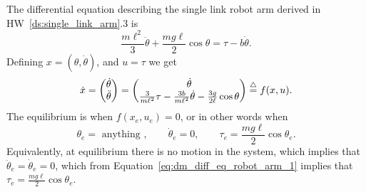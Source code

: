 
The differential equation describing the single link robot arm derived in HW~\ref{ds:single_link_arm}.3 is
\begin{equation}\label{eq:dm_diff_eq_robot_arm_1}
\frac{m\ell^2}{3}\ddot{\theta} + \frac{mg\ell}{2}\cos\theta = \tau - b\dot{\theta}.
\end{equation}
Defining $x=(\theta, \dot{\theta})$, and $u=\tau$ we get
\begin{align*}
\dot{x} = \begin{pmatrix} \dot{\theta} \\ \ddot{\theta}\end{pmatrix} 
= \begin{pmatrix} \dot{\theta} \\ \frac{3}{m\ell^2}\tau - \frac{3b}{m\ell^2}\dot{\theta} - \frac{3g}{2\ell}\cos\theta \end{pmatrix} \stackrel{\triangle}{=} f(x,u).
\end{align*}
The equilibrium is when $f(x_e,u_e)=0$, or in other words when
\begin{equation}\label{dm:arm_equilibrium}
\theta_e = \text{~anything~}, \qquad \dot{\theta}_e =0, \qquad \tau_e = \frac{mg\ell}{2}\cos\theta_e.
\end{equation}
Equivalently, at equilibrium there is no motion in the system, which implies that $\ddot{\theta}_e = \dot{\theta}_e=0$, which from Equation~\eqref{eq:dm_diff_eq_robot_arm_1} implies that $\tau_e = \frac{mg\ell}{2}\cos\theta_e$.

